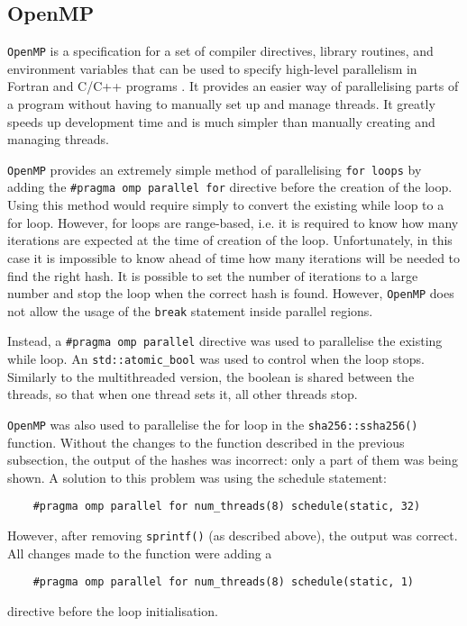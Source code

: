 \documentclass[12pt, a4paper]{article}
\begin{document}
    \subsection{OpenMP}
    \texttt{OpenMP} is a specification for a set of compiler directives, library routines, and environment variables that can be used to specify high-level parallelism in Fortran and C/C++ programs \cite{omp}. It provides an easier way of parallelising parts of a program without having to manually set up and manage threads. It greatly speeds up development time and is much simpler than manually creating and managing threads.

    \texttt{OpenMP} provides an extremely simple method of parallelising \texttt{for loops} by adding the \verb|#pragma omp parallel for| directive before the creation of the loop. Using this method would require simply to convert the existing while loop to a for loop. However, for loops are range-based, i.e. it is required to know how many iterations are expected at the time of creation of the loop. Unfortunately, in this case it is impossible to know ahead of time how many iterations will be needed to find the right hash. It is possible to set the number of iterations to a large number and stop the loop when the correct hash is found. However, \texttt{OpenMP} does not allow the usage of the \texttt{break} statement inside parallel regions.

    Instead, a \verb|#pragma omp parallel| directive was used to parallelise the existing while loop. An \texttt{std::atomic\_bool} was used to control when the loop stops. Similarly to the multithreaded version, the boolean is shared between the threads, so that when one thread sets it, all other threads stop.     

    \texttt{OpenMP} was also used to parallelise the for loop in the \texttt{sha256::ssha256()} function. Without the changes to the function described in the previous subsection, the output of the hashes was incorrect: only a part of them was being shown. A solution to this problem was using the schedule statement:
    \begin{lstlisting}
    #pragma omp parallel for num_threads(8) schedule(static, 32) \end{lstlisting}
    However, after removing \texttt{sprintf()} (as described above), the output was correct. All changes made to the function were adding a 
    \begin{lstlisting}
    #pragma omp parallel for num_threads(8) schedule(static, 1) \end{lstlisting} directive before the loop initialisation.
\end{document}

